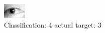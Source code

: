 \begin{figure}[h!]
\begin{center}
\includegraphics[width=0.60\columnwidth]{figures/ID1261_class_4_target_3.png}
\end{center}
\caption{ Classification: 4 actual target: 3}
\label{fig:ID1261_class_4_target_3}
\end{figure}
